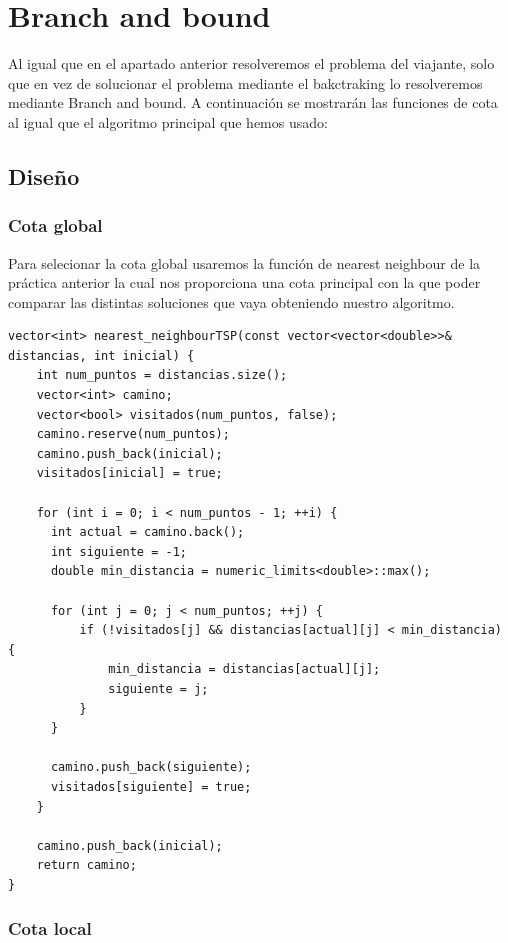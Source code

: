 \documentclass[11pt,openany]{book}
\begin{document}
\chapter{Branch and bound}
Al igual que en el apartado anterior resolveremos el problema del viajante, solo que en vez de solucionar el problema mediante el bakctraking 
lo resolveremos mediante Branch and bound. A continuación se mostrarán las funciones de cota al igual que el algoritmo principal que hemos usado:

\section{Diseño}
\subsection{Cota global}
Para selecionar la cota global usaremos la función de nearest neighbour de la práctica anterior la cual 
nos proporciona una cota principal con la que poder comparar las distintas soluciones que vaya obteniendo nuestro algoritmo.

\begin{lstlisting}
vector<int> nearest_neighbourTSP(const vector<vector<double>>& distancias, int inicial) {
    int num_puntos = distancias.size();
    vector<int> camino;
    vector<bool> visitados(num_puntos, false);
    camino.reserve(num_puntos);
    camino.push_back(inicial);
    visitados[inicial] = true;

    for (int i = 0; i < num_puntos - 1; ++i) {
      int actual = camino.back();
      int siguiente = -1;
      double min_distancia = numeric_limits<double>::max();

      for (int j = 0; j < num_puntos; ++j) {
          if (!visitados[j] && distancias[actual][j] < min_distancia) {
              min_distancia = distancias[actual][j];
              siguiente = j;
          }
      }

      camino.push_back(siguiente);
      visitados[siguiente] = true;
    }

    camino.push_back(inicial);
    return camino;
}

\end{lstlisting} 

      
\subsection{Cota local}
\end{document}
